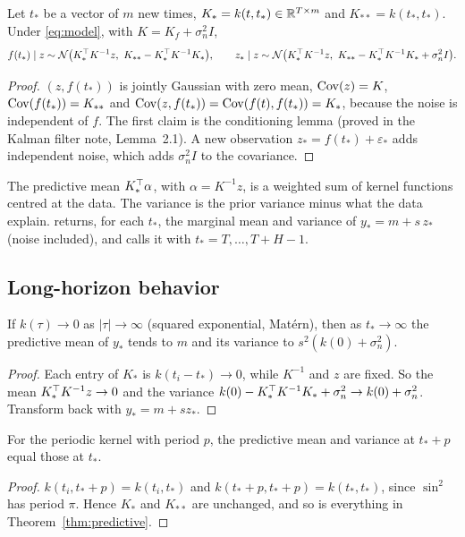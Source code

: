 \documentclass[11pt,a4paper]{article}
\begin{document}
\begin{theorem}\label{thm:predictive}
Let $t_*$ be a vector of $m$ new times, $K_* = k(t,t_*)\in\mathbb{R}^{T\times m}$ and
$K_{**}=k(t_*,t_*)$. Under \eqref{eq:model}, with $K=K_f+\sigma_n^2I$,
\[
  f(t_*)\mid z\sim\N\big(K_*^\T K^{-1}z,\ K_{**}-K_*^\T K^{-1}K_*\big),\qquad
  z_*\mid z\sim\N\big(K_*^\T K^{-1}z,\ K_{**}-K_*^\T K^{-1}K_*+\sigma_n^2I\big).
\]
\end{theorem}
\begin{proof}
$(z,f(t_*))$ is jointly Gaussian with zero mean, $\operatorname{Cov}(z)=K$, $\operatorname{Cov}(f(t_*))=K_{**}$
and $\operatorname{Cov}(z,f(t_*))=\operatorname{Cov}(f(t),f(t_*))=K_*$, because the noise is independent of $f$. The first claim is the
conditioning lemma (proved in the Kalman filter note, Lemma~2.1). A new observation
$z_*=f(t_*)+\varepsilon_*$ adds independent noise, which adds $\sigma_n^2I$ to the covariance.
\end{proof}

The predictive mean $K_*^\top\alpha$, with $\alpha=K^{-1}z$, is a weighted sum of kernel
functions centred at the data. The variance is the prior variance minus what the
data explain.  returns, for each $t_*$, the
marginal mean and variance of $y_*=m+s\,z_*$ (noise included), and
 calls it with $t_*=T,\dots,T+H-1$.

\subsection{Long-horizon behavior}

\begin{proposition}\label{prop:reversion}
If $k(\tau)\to0$ as $|\tau|\to\infty$ (squared exponential, Matérn), then as
$t_*\to\infty$ the predictive mean of $y_*$ tends to $m$ and its variance to
$s^2(k(0)+\sigma_n^2)$.
\end{proposition}
\begin{proof}
Each entry of $K_*$ is $k(t_i-t_*)\to0$, while $K^{-1}$ and $z$ are fixed. So the mean
$K_*^\top K^{-1}z\to0$ and the variance $k(0)-K_*^\top K^{-1}K_*+\sigma_n^2\to k(0)+\sigma_n^2$.
Transform back with $y_*=m+sz_*$.
\end{proof}

\begin{proposition}\label{prop:periodic}
For the periodic kernel with period $p$, the predictive mean and variance at
$t_*+p$ equal those at $t_*$.
\end{proposition}
\begin{proof}
$k(t_i,t_*+p)=k(t_i,t_*)$ and $k(t_*+p,t_*+p)=k(t_*,t_*)$, since $\sin^2$ has period $\pi$. Hence $K_*$ and
$K_{**}$ are unchanged, and so is everything in Theorem~\ref{thm:predictive}.
\end{proof}
\end{document}
